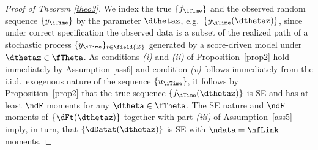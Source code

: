 


\proofskip
\begin{proof}[Proof of Theorem \ref{theo3}]
We index the true $\{f_{\iTime}\}$ and the observed random sequence $\{y_{\iTime}\}$ by the parameter $\dthetaz$, e.g.~$\{y_{\iTime}(\dthetaz)\}$, since  under correct specification the observed data is a subset of the realized path of a stochastic process $\{y_{\iTime}\}_{t \in \field{Z}}$ generated by a score-driven model under $\dthetaz \in \fTheta$.
As conditions \textit{(i)} and \textit{(ii)} of Proposition~\ref{prop2} hold immediately by Assumption \ref{ass6} and condition \textit{(v)} follows immediately from the i.i.d.\ exogenous nature of the sequence $\{u_{\iTime}\}$, it follows by Proposition~\ref{prop2} that the true sequence $\{f_{\iTime}(\dthetaz)\}$ is SE and has at least $\ndF$ moments for any $\dtheta \in \fTheta$. 
The SE nature and $\ndF$ moments of $\{\dFt(\dthetaz)\}$ together with part \textit{(iii)} of 
Assumption~\ref{ass5} imply, in turn, that $\{\dDatat(\dthetaz)\}$ is SE with $\ndata = \nfLink$ moments. 


\end{proof}
